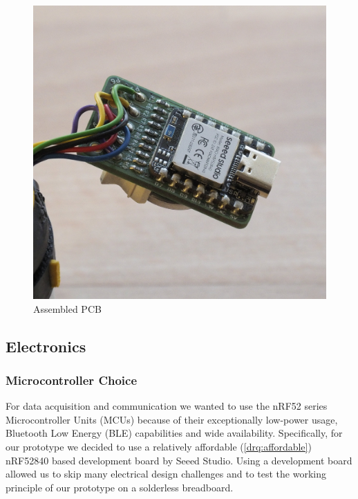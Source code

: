 \begin{figure}[!htb]
\begin{minipage}{.3333\textwidth}
        \caption{\rotatorhead}
        \label{fig:cad_rotator_head}
    \end{minipage}%
    \begin{minipage}{.3333\textwidth}
        \centering
        \includegraphics[width=.9\linewidth]{images/likertshift_pcb.jpg}
        \caption{Assembled PCB}
        \label{fig:likertshift_pcb}
    \end{minipage}
\end{figure}

\noindent

\subsection{Electronics}\label{subsec:electronics}

\subsubsection{Microcontroller Choice}

For data acquisition and communication we wanted to use the nRF52 series Microcontroller Units (MCUs) because of their exceptionally low-power usage, Bluetooth Low Energy (BLE) capabilities and wide availability.
Specifically, for our prototype we decided to use a relatively affordable (\ref{drq:affordable}) nRF52840 based development board by Seeed Studio.
Using a development board allowed us to skip many electrical design challenges and to test the working principle of our prototype on a solderless breadboard.

